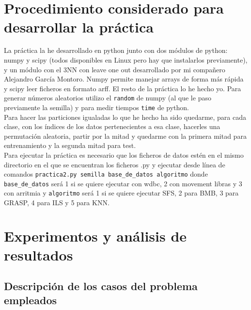 \documentclass[12pt]{article}
\begin{document}
\newpage

\section{Procedimiento considerado para desarrollar la práctica}
La práctica la he desarrollado en python junto con dos módulos de python: numpy y scipy (todos disponibles en Linux pero hay que instalarlos previamente), y un módulo con el 3NN con leave one out desarrollado por mi compañero Alejandro García Montoro. Numpy permite manejar arrays de forma más rápida y scipy leer ficheros en formato arff. El resto de la práctica lo he hecho yo. Para generar números aleatorios utilizo el \texttt{random} de numpy (al que le paso previamente la semilla) y para medir tiempos \texttt{time} de python.\\

Para hacer las particiones igualadas lo que he hecho ha sido quedarme, para cada clase, con los índices de los datos pertenecientes a esa clase, hacerles una permutación aleatoria, partir por la mitad y quedarme con la primera mitad para entrenamiento y la segunda mitad para test.\\

Para ejecutar la práctica es necesario que los ficheros de datos estén en el mismo directorio en el que se encuentran los ficheros .py y ejecutar desde línea de comandos \texttt{practica2.py semilla base\_de\_datos algoritmo} donde \texttt{base\_de\_datos} será 1 si se quiere ejecutar con wdbc, 2 con movement libras y 3 con arritmia y \texttt{algoritmo} será 1 si se quiere ejecutar SFS, 2 para BMB, 3 para GRASP, 4 para ILS y 5 para KNN.

\newpage

\section{Experimentos y análisis de resultados}
\subsection{Descripción de los casos del problema empleados}
\end{document}
